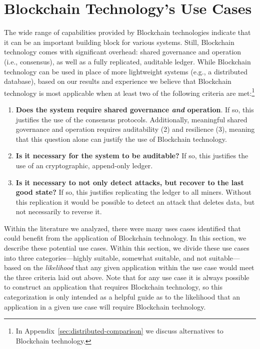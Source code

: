 
\section{Blockchain Technology's Use Cases}
\label{sec:use-cases}


The wide range of capabilities provided by Blockchain technologies indicate that it can be an important building block for various systems.
Still, Blockchain technology comes with significant overhead: shared governance and operation (i.e., consensus), as well as  a fully replicated, auditable ledger.
While Blockchain technology can be used in place of more lightweight systems (e.g., a distributed database), based on our results and experience we believe that Blockchain technology is most applicable when at least two of the following criteria are met:\footnote{In Appendix~\ref{sec:distributed-comparison} we discuss alternatives to Blockchain technology.}

\begin{enumerate}
	\item \textbf{Does the system require shared governance \emph{and} operation}. If so, this justifies the use of the consensus protocols. Additionally, meaningful shared governance and operation requires auditability (2) and resilience (3), meaning that this question alone can justify the use of Blockchain technology.
	\item \textbf{Is it necessary for the system to be auditable?} If so, this justifies the use of an cryptographic, append-only ledger.
	\item \textbf{Is it necessary to not only detect attacks, but recover to the last good state?} If so, this justifies replicating the ledger to all miners. Without this replication it would be possible to detect an attack that deletes data, but not necessarily to reverse it.	
\end{enumerate}

Within the literature we analyzed, there were many uses cases identified that could benefit from the application of Blockchain technology.
In this section, we describe these potential use cases.
Within this section, we divide these use cases into three categories---highly suitable, somewhat suitable, and not suitable---based on the \emph{likelihood} that any given application within the use case would meet the three criteria laid out above.
Note that for any use case it is always possible to construct an application that requires Blockchain technology, so this categorization is only intended as a helpful guide as to the likelihood that an application in a given use case will require Blockchain technology.

